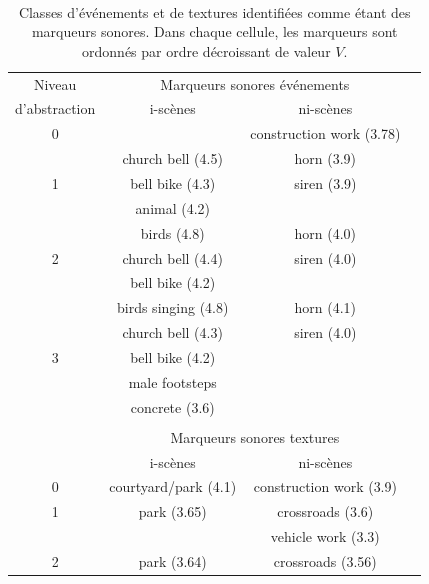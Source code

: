  \\

\begin{table}[t]
 \setlength{\tabcolsep}{0.2pt}
 \centering
  {\renewcommand{\arraystretch}{0.9}
\begin{tabular}{c c c c} 
Niveau        & \multicolumn{2}{c}{Marqueurs sonores événements} \\
d'abstraction & i-scènes & ni-scènes \\
\hline
0  &                               &  construction work (3.78)  \\
\hline
  & church bell  (4.5)             & horn  (3.9) \\
1 & bell bike    (4.3)             & siren (3.9)\\
  & animal       (4.2)             &       \\
   \hline
  & birds        (4.8)             & horn  (4.0)\\
2 & church bell  (4.4)             & siren (4.0)\\
  & bell bike    (4.2)             &       \\
   \hline
  & birds singing (4.8)            & horn  (4.1)\\
  & church bell   (4.3)            & siren (4.0)\\
3 & bell bike     (4.2)            &       \\
  & male footsteps                 &  \\
  &   concrete (3.6)               &  \\
  &                                & \\ 
  & \multicolumn{2}{c}{Marqueurs sonores textures}      \\
  & i-scènes & ni-scènes \\
\hline
0 &     courtyard/park (4.1)       &  construction work (3.9)  \\
\hline
1 &     park (3.65)                &  crossroads (3.6)  \\
  &                                &  vehicle work (3.3)  \\
\hline
2 &     park (3.64)                &  crossroads (3.56)  \\
\hline
\end{tabular}
}
\vspace{0.5mm}
\caption[Classes d'événements et de textures identifiées comme étant des marqueurs sonores]{Classes d'événements et de textures identifiées comme étant des marqueurs sonores. Dans chaque cellule, les marqueurs sont ordonnés par ordre décroissant de valeur $V$.}
\label{tab:markers}
\end{table}

